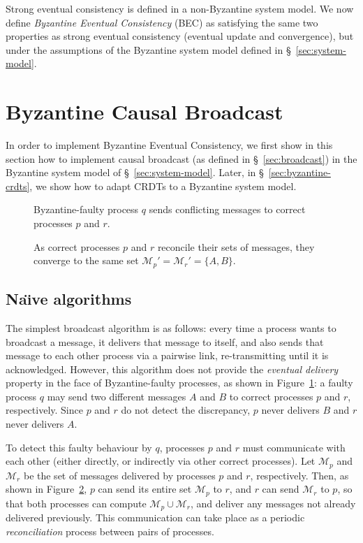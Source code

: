 \documentclass[a4paper,anonymous,USenglish]{lipics-v2019}
\begin{document}
Strong eventual consistency is defined in a non-Byzantine system model.
We now define \emph{Byzantine Eventual Consistency} (BEC) as satisfying the same two properties as strong eventual consistency (eventual update and convergence), but under the assumptions of the Byzantine system model defined in \S~\ref{sec:system-model}.


\section{Byzantine Causal Broadcast}\label{sec:algorithm}

In order to implement Byzantine Eventual Consistency, we first show in this section how to implement causal broadcast (as defined in \S~\ref{sec:broadcast}) in the Byzantine system model of \S~\ref{sec:system-model}.
Later, in \S~\ref{sec:byzantine-crdts}, we show how to adapt CRDTs to a Byzantine system model.

\begin{figure}
    \centering
    
    \caption{Byzantine-faulty process $q$ sends conflicting messages to correct processes $p$ and $r$.}
    \label{fig:trivial1}
\end{figure}

\begin{figure}
    \centering
    
    \caption{As correct processes $p$ and $r$ reconcile their sets of messages, they converge to the same set $\mathcal{M}_p' = \mathcal{M}_r' = \{A,B\}$.}
    \label{fig:trivial2}
\end{figure}

\subsection{Na\"{\i}ve algorithms}

The simplest broadcast algorithm is as follows: every time a process wants to broadcast a message, it delivers that message to itself, and also sends that message to each other process via a pairwise link, re-transmitting until it is acknowledged.
However, this algorithm does not provide the \emph{eventual delivery} property in the face of Byzantine-faulty processes, as shown in Figure~\ref{fig:trivial1}: a faulty process $q$ may send two different messages $A$ and $B$ to correct processes $p$ and $r$, respectively.
Since $p$ and $r$ do not detect the discrepancy, $p$ never delivers $B$ and $r$ never delivers $A$.

To detect this faulty behaviour by $q$, processes $p$ and $r$ must communicate with each other (either directly, or indirectly via other correct processes).
Let $\mathcal{M}_p$ and $\mathcal{M}_r$ be the set of messages delivered by processes $p$ and $r$, respectively.
Then, as shown in Figure~\ref{fig:trivial2}, $p$ can send its entire set $\mathcal{M}_p$ to $r$, and $r$ can send $\mathcal{M}_r$ to $p$, so that both processes can compute $\mathcal{M}_p \cup \mathcal{M}_r$, and deliver any messages not already delivered previously.
This communication can take place as a periodic \emph{reconciliation} process between pairs of processes.
\end{document}
